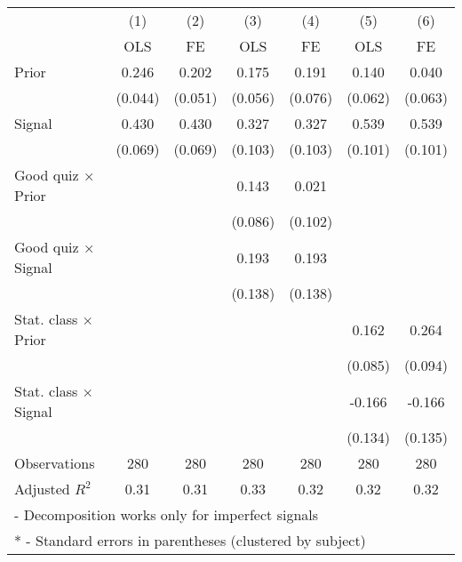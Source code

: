 \begin{tabular}{l*{6}{c}}
\hline\hline
                &\multicolumn{1}{c}{(1)}&\multicolumn{1}{c}{(2)}&\multicolumn{1}{c}{(3)}&\multicolumn{1}{c}{(4)}&\multicolumn{1}{c}{(5)}&\multicolumn{1}{c}{(6)}\\
                &\multicolumn{1}{c}{OLS}&\multicolumn{1}{c}{FE}&\multicolumn{1}{c}{OLS}&\multicolumn{1}{c}{FE}&\multicolumn{1}{c}{OLS}&\multicolumn{1}{c}{FE}\\
\hline
Prior           &    0.246&    0.202&    0.175&    0.191&    0.140&    0.040\\
                &  (0.044)&  (0.051)&  (0.056)&  (0.076)&  (0.062)&  (0.063)\\
Signal          &    0.430&    0.430&    0.327&    0.327&    0.539&    0.539\\
                &  (0.069)&  (0.069)&  (0.103)&  (0.103)&  (0.101)&  (0.101)\\
Good quiz $\times$ Prior&         &         &    0.143&    0.021&         &         \\
                &         &         &  (0.086)&  (0.102)&         &         \\
Good quiz $\times$ Signal&         &         &    0.193&    0.193&         &         \\
                &         &         &  (0.138)&  (0.138)&         &         \\
Stat. class $\times$ Prior&         &         &         &         &    0.162&    0.264\\
                &         &         &         &         &  (0.085)&  (0.094)\\
Stat. class $\times$ Signal&         &         &         &         &   -0.166&   -0.166\\
                &         &         &         &         &  (0.134)&  (0.135)\\
\hline
Observations    &      280&      280&      280&      280&      280&      280\\
Adjusted \(R^{2}\)&     0.31&     0.31&     0.33&     0.32&     0.32&     0.32\\
\hline\hline
\multicolumn{7}{l}{\footnotesize * - Decomposition works only for imperfect signals}\\
\multicolumn{7}{l}{\footnotesize ** - Standard errors in parentheses (clustered by subject)}\\
\end{tabular}

